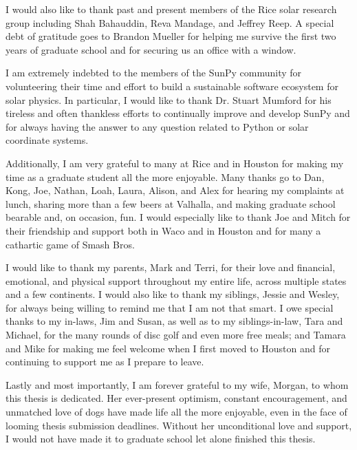 \begin{acknowledgements}
I would also like to thank past and present members of the Rice solar research group including Shah Bahauddin, Reva Mandage, and Jeffrey Reep. A special debt of gratitude goes to Brandon Mueller for helping me survive the first two years of graduate school and for securing us an office with a window.

I am extremely indebted to the members of the SunPy community for volunteering their time and effort to build a sustainable software ecosystem for solar physics. In particular, I would like to thank Dr. Stuart Mumford for his tireless and often thankless efforts to continually improve and develop SunPy and for always having the answer to any question related to Python or solar coordinate systems.

Additionally, I am very grateful to many at Rice and in Houston for making my time as a graduate student all the more enjoyable. Many thanks go to Dan, Kong, Joe, Nathan, Loah, Laura, Alison, and Alex for hearing my complaints at lunch, sharing more than a few beers at Valhalla, and making graduate school bearable and, on occasion, fun. I would especially like to thank Joe and Mitch for their friendship and support both in Waco and in Houston and for many a cathartic game of Smash Bros.

I would like to thank my parents, Mark and Terri, for their love and financial, emotional, and physical support throughout my entire life, across multiple states and a few continents. I would also like to thank my siblings, Jessie and Wesley, for always being willing to remind me that I am not that smart. I owe special thanks to my in-laws, Jim and Susan, as well as to my siblings-in-law, Tara and Michael, for the many rounds of disc golf and even more free meals; and Tamara and Mike for making me feel welcome when I first moved to Houston and for continuing to support me as I prepare to leave.

Lastly and most importantly, I am forever grateful to my wife, Morgan, to whom this thesis is dedicated. Her ever-present optimism, constant encouragement, and unmatched love of dogs have made life all the more enjoyable, even in the face of looming thesis submission deadlines. Without her unconditional love and support, I would not have made it to graduate school let alone finished this thesis.

\end{acknowledgements}
